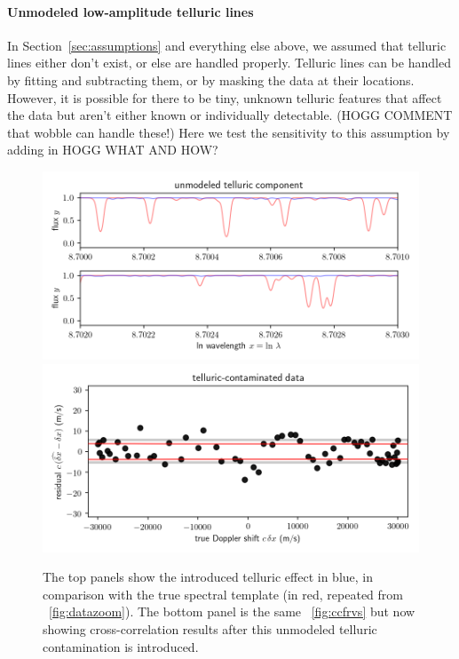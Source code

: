 \documentclass[modern]{aastex631}
\newcommand{\sectionname}{Section}
\newcommand{\secref}[1]{\sectionname~\ref{#1}}
\newcommand{\figref}[1]{\figurename~\ref{#1}}
\begin{document}
\noindent
\paragraph{Unmodeled low-amplitude telluric lines}
In \secref{sec:assumptions} and everything else above, we assumed that telluric lines either don't exist, or else are handled properly.
Telluric lines can be handled by fitting and subtracting them, or by masking the data at their locations.
However, it is possible for there to be tiny, unknown telluric features that affect the data but aren't either known or individually detectable.
(HOGG COMMENT that wobble can handle these!)
Here we test the sensitivity to this assumption by adding in HOGG WHAT AND HOW?

\begin{figure}[tp]
  \begin{mdframed}
    \begin{center}
    \includegraphics[width=\textwidth]{../notebook/telluricmodel.png}
    \includegraphics[width=\textwidth]{../notebook/telluric.png}
    \end{center}
    \caption{The top panels show the introduced telluric effect in blue, in comparison with the true spectral template (in red, repeated from \figref{fig:datazoom}). The bottom panel is the same \figref{fig:ccfrvs} but now showing cross-correlation results after this unmodeled telluric contamination is introduced.\label{fig:variable}}
  \end{mdframed}
\end{figure}
\end{document}
